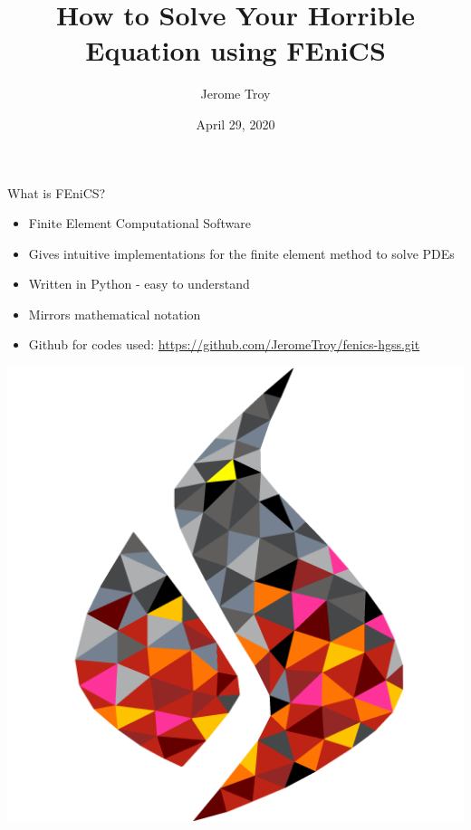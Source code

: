 \documentclass[serif]{beamer}
\title[Horrible Problems]{How to Solve Your Horrible Equation using FEniCS}
\author{Jerome Troy}
\institute[UD]{University of Delaware}
\date{April 29, 2020} %
\begin{document}
\begin{frame}
\titlepage %
\end{frame}

\begin{frame}{What is FEniCS?}
    \begin{itemize}
        \item Finite Element Computational Software
        \item Gives intuitive implementations for the finite element method to solve PDEs
        \item Written in Python - easy to understand 
        \item Mirrors mathematical notation
        \item Github for codes used: \url{https://github.com/JeromeTroy/fenics-hgss.git}
    \end{itemize}
    
    \centering
    \includegraphics[scale=0.25]{figures/fenics-logo.png}
\end{frame}
\end{document}
